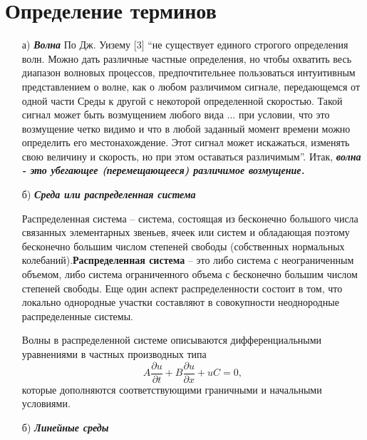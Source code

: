 \documentclass[a4paper]{article}
\begin{document}
\section*{Определение терминов}
\begin{itemize}
	\item[а)] \textbf{\textit{Волна}}  По Дж. Уизему [3] “не существует единого строгого определения волн. Можно дать различные частные определения, но чтобы охватить весь диапазон волновых процессов, предпочтительнее пользоваться интуитивным представлением о волне, как о любом различимом сигнале, передающемся от одной части Среды к другой с некоторой определенной скоростью. Такой сигнал может быть возмущением любого вида ... при условии, что это возмущение четко видимо и что в любой заданный момент времени можно определить его местонахождение. Этот сигнал может искажаться, изменять свою величину и скорость, но при этом оставаться различимым”. Итак, \textit{\textbf{волна - это убегающее (перемещающееся) различимое возмущение.}}
	\item[б)] \textbf{\textit{Среда или распределенная система}} 
	
	Распределенная система – система, состоящая из бесконечно большого числа связанных элементарных звеньев, ячеек или систем и обладающая поэтому бесконечно большим числом степеней свободы (собственных нормальных колебаний).\newline \textbf{Распределенная система} -- это  либо система с неограниченным объемом, либо система ограниченного объема с бесконечно большим числом степеней свободы. Еще один аспект распределенности состоит в том, что локально однородные участки составляют в совокупности неоднородные распределенные системы.
	
	Волны в распределенной системе описываются дифференциальными уравнениями в частных производных типа
	\begin{equation}
		A\frac{\partial u}{\partial t}+B\frac{\partial u}{\partial x}+uC=0  ,
	\end{equation}
	которые дополняются соответствующими граничными и начальными условиями. 
	
	\item[б)] \textbf{\textit{Линейные среды}}
	

\end{itemize}
\end{document}

